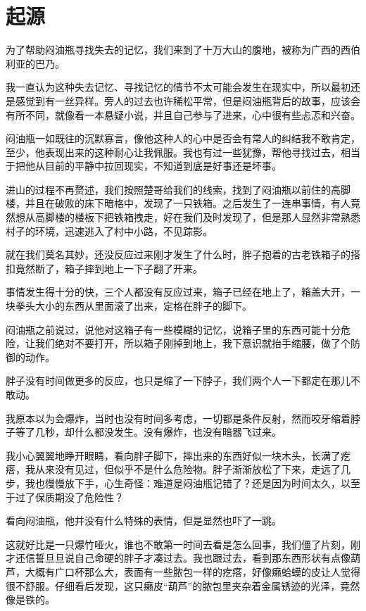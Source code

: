 \chapter{起源}

为了帮助闷油瓶寻找失去的记忆，我们来到了十万大山的腹地，被称为广西的西伯利亚的巴乃。

我一直认为这种失去记忆、寻找记忆的情节不太可能会发生在现实中，所以最初还是感觉到有一丝异样。旁人的过去也许稀松平常，但是闷油瓶背后的故事，应该会有所不同，就像看一本悬疑小说，并且自己参与了进来，心中很有些忐忑和兴奋。

闷油瓶一如既往的沉默寡言，像他这种人的心中是否会有常人的纠结我不敢肯定，至少，他表现出来的这种耐心让我佩服。我也有过一些犹豫，帮他寻找过去，相当于把他从目前的平静中拉回现实，不知道到底是好事还是坏事。

进山的过程不再赘述，我们按照楚哥给我们的线索，找到了闷油瓶以前住的高脚楼，并且在破败的床下暗格中，发现了一只铁箱。之后发生了一连串事情，有人竟然想从高脚楼的楼板下把铁箱拽走，好在我们及时发现了，但是那人显然非常熟悉村子的环境，迅速逃入了村中小路，不见踪影。

就在我们莫名其妙，还没反应过来刚才发生了什么时，胖子抱着的古老铁箱子的搭扣竟然断了，箱子摔到地上一下子翻了开来。

事情发生得十分的快，三个人都没有反应过来，箱子已经在地上了，箱盖大开，一块拳头大小的东西从里面滚了出来，定格在胖子的脚下。

闷油瓶之前说过，说他对这箱子有一些模糊的记忆，说箱子里的东西可能十分危险，让我们绝对不要打开，所以箱子刚掉到地上，我下意识就抬手缩腰，做了个防御的动作。

胖子没有时间做更多的反应，也只是缩了一下脖子，我们两个人一下都定在那儿不敢动。

我原本以为会爆炸，当时也没有时间多考虑，一切都是条件反射，然而咬牙缩着脖子等了几秒，却什么都没发生。没有爆炸，也没有暗器飞过来。

我小心翼翼地睁开眼睛，看向胖子脚下，摔出来的东西好似一块木头，长满了疙瘩，我从来没有见过，但似乎不是什么危险物。胖子渐渐放松了下来，走远了几步，我也慢慢放下手，心生奇怪：难道是闷油瓶记错了？还是因为时间太久，以至于过了保质期没了危险性？

看向闷油瓶，他并没有什么特殊的表情，但是显然也吓了一跳。

这就好比是一只爆竹哑火，谁也不敢第一时间去看是怎么回事，我们僵了片刻，刚才还信誓旦旦说自己命硬的胖子才凑过去。我也跟过去，看到那东西形状有点像葫芦，大概有广口杯那么大，表面有一些脓包一样的疙瘩，好像癞蛤蟆的皮让人觉得很不舒服。仔细看后发现，这只癞皮“葫芦”的脓包里夹杂着金属锈迹的光泽，竟然像是铁的。

